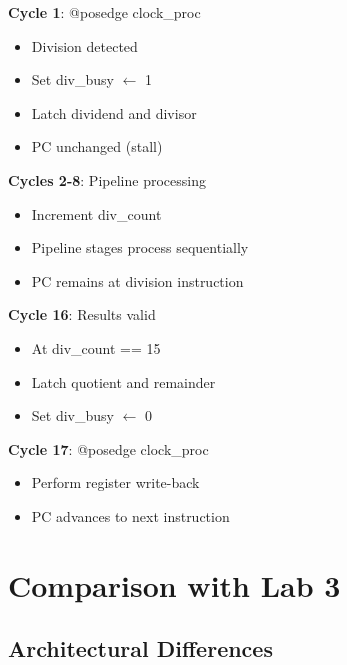 \documentclass[a4paper, 11pt]{article}
\begin{document}
\begin{algorithm}[H]
\DontPrintSingleQuotedStrings
\DontPrintSemicolon

\textbf{Cycle 1}: @posedge clock\_proc
\begin{itemize}
    \item Division detected
    \item Set div\_busy $\leftarrow$ 1
    \item Latch dividend and divisor
    \item PC unchanged (stall)
\end{itemize}

\textbf{Cycles 2-8}: Pipeline processing
\begin{itemize}
    \item Increment div\_count
    \item Pipeline stages process sequentially
    \item PC remains at division instruction
\end{itemize}

\textbf{Cycle 16}: Results valid
\begin{itemize}
    \item At div\_count == 15
    \item Latch quotient and remainder
    \item Set div\_busy $\leftarrow$ 0
\end{itemize}

\textbf{Cycle 17}: @posedge clock\_proc
\begin{itemize}
    \item Perform register write-back
    \item PC advances to next instruction
\end{itemize}

\caption{Division Instruction Timing (16 cycles)}
\end{algorithm}

\newpage

\section{Comparison with Lab 3}

\subsection{Architectural Differences}
\end{document}
